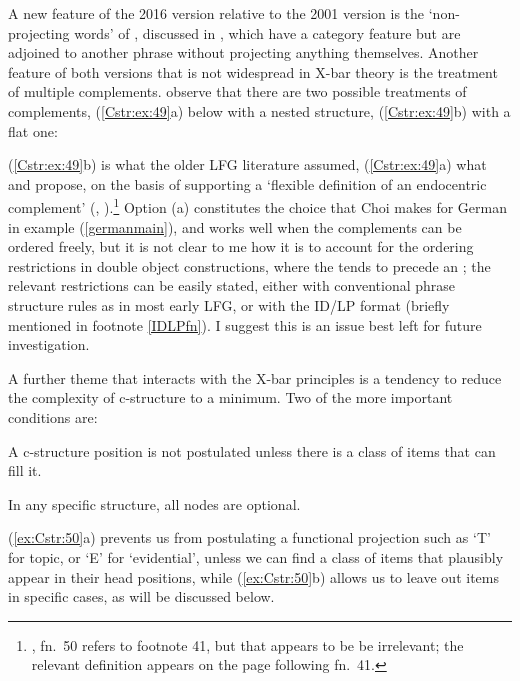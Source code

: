 \documentclass[output=paper,hidelinks]{langscibook}
\begin{document}
A new feature of the 2016 version relative to the 2001 version is the `non-projecting words'
of \citet{Toivonen2001}, discussed in , which have
a category feature but are adjoined to another phrase without projecting
anything themselves.  Another feature of both versions that is not widespread
in X-bar theory is the treatment of multiple complements.  \citet[127]{BresnanEtAl2016}
observe that there are two possible treatments of complements, (\ref{Cstr:ex:49}a) below
with a nested structure, (\ref{Cstr:ex:49}b) with a flat one:
\ea\label{Cstr:ex:49}
\begin{xlist}
\item
{}
\item
{}
\end{xlist}
\z
(\ref{Cstr:ex:49}b) is what the older LFG literature assumed, (\ref{Cstr:ex:49}a) what
\citet{bresnan2001lexical} and \citet{BresnanEtAl2016} propose, on the
basis of supporting a `flexible definition of an endocentric complement' (\citealt[118]{bresnan2001lexical}, \citealt[123]{BresnanEtAl2016}).\footnote
 {\citet{BresnanEtAl2016}, fn.~50 refers to footnote 41, but that appears to be
 be irrelevant; the relevant definition appears on the page following fn.~41.}
Option (a) constitutes the choice that Choi makes for German in
example (\ref{germanmain}), and works well when the complements can
be ordered freely, but it is not clear to me how it is
to account for the ordering restrictions in double object constructions,
where the {\OBJ} tends to precede an {\OBJTHETA}; the relevant restrictions
can be easily stated, either with conventional phrase structure rules as in most early LFG,
or with the ID/LP format (briefly mentioned in footnote \ref{IDLPfn}).
I suggest this is an issue best left for future investigation.

A further theme that interacts with the X-bar principles is a tendency to
reduce the complexity of c-structure to a minimum.  Two of the more important
conditions are:
\ea\label{ex:Cstr:50}
\begin{xlist}
\item
A c-structure position is not postulated unless there is a class of items that
can fill it.
\item
In any specific structure, all nodes are optional.
\end{xlist}
\z
(\ref{ex:Cstr:50}a) prevents us from postulating a functional projection such as `T' for topic,
or `E' for `evidential',
unless we can find a class of items that plausibly appear in their head positions,
while (\ref{ex:Cstr:50}b) allows us to leave out items in specific cases, as will
be discussed below.
\end{document}
